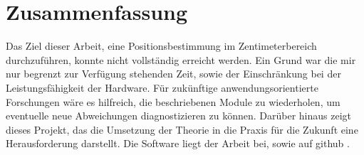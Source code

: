 \newpage
\section{Zusammenfassung}

Das Ziel dieser Arbeit, eine Positionsbestimmung im Zentimeterbereich durchzuführen, konnte nicht vollständig erreicht werden. Ein Grund war die mir nur begrenzt zur Verfügung stehenden Zeit, sowie der Einschränkung bei der Leistungsfähigkeit der Hardware. Für zukünftige anwendungsorientierte Forschungen wäre es hilfreich, die beschriebenen Module zu wiederholen, um eventuelle neue Abweichungen diagnostizieren zu können. Darüber hinaus zeigt dieses Projekt, das die Umsetzung der Theorie in die Praxis für die Zukunft eine Herausforderung darstellt. Die Software liegt der Arbeit bei, sowie auf github \cite{src_GITHUB_CODE_BA}.